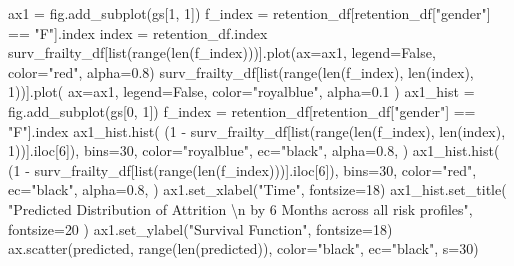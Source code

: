 \documentclass[
  letterpaper,
  DIV=11,
  numbers=noendperiod]{scrartcl}
\newenvironment{Shaded}{\begin{snugshade}}{\end{snugshade}}
\newcommand{\BuiltInTok}[1]{\textcolor[rgb]{0.00,0.23,0.31}{#1}}
\newcommand{\CharTok}[1]{\textcolor[rgb]{0.13,0.47,0.30}{#1}}
\newcommand{\DecValTok}[1]{\textcolor[rgb]{0.68,0.00,0.00}{#1}}
\newcommand{\FloatTok}[1]{\textcolor[rgb]{0.68,0.00,0.00}{#1}}
\newcommand{\NormalTok}[1]{\textcolor[rgb]{0.00,0.23,0.31}{#1}}
\newcommand{\OperatorTok}[1]{\textcolor[rgb]{0.37,0.37,0.37}{#1}}
\newcommand{\StringTok}[1]{\textcolor[rgb]{0.13,0.47,0.30}{#1}}
\newcommand{\VariableTok}[1]{\textcolor[rgb]{0.07,0.07,0.07}{#1}}
\begin{document}
\begin{Shaded}
\begin{Highlighting}[]
\NormalTok{ax1 }\OperatorTok{=}\NormalTok{ fig.add\_subplot(gs[}\DecValTok{1}\NormalTok{, }\DecValTok{1}\NormalTok{])}
\NormalTok{f\_index }\OperatorTok{=}\NormalTok{ retention\_df[retention\_df[}\StringTok{"gender"}\NormalTok{] }\OperatorTok{==} \StringTok{"F"}\NormalTok{].index}
\NormalTok{index }\OperatorTok{=}\NormalTok{ retention\_df.index}
\NormalTok{surv\_frailty\_df[}\BuiltInTok{list}\NormalTok{(}\BuiltInTok{range}\NormalTok{(}\BuiltInTok{len}\NormalTok{(f\_index)))].plot(ax}\OperatorTok{=}\NormalTok{ax1, legend}\OperatorTok{=}\VariableTok{False}\NormalTok{, color}\OperatorTok{=}\StringTok{"red"}\NormalTok{, alpha}\OperatorTok{=}\FloatTok{0.8}\NormalTok{)}
\NormalTok{surv\_frailty\_df[}\BuiltInTok{list}\NormalTok{(}\BuiltInTok{range}\NormalTok{(}\BuiltInTok{len}\NormalTok{(f\_index), }\BuiltInTok{len}\NormalTok{(index), }\DecValTok{1}\NormalTok{))].plot(}
\NormalTok{    ax}\OperatorTok{=}\NormalTok{ax1, legend}\OperatorTok{=}\VariableTok{False}\NormalTok{, color}\OperatorTok{=}\StringTok{"royalblue"}\NormalTok{, alpha}\OperatorTok{=}\FloatTok{0.1}
\NormalTok{)}
\NormalTok{ax1\_hist }\OperatorTok{=}\NormalTok{ fig.add\_subplot(gs[}\DecValTok{0}\NormalTok{, }\DecValTok{1}\NormalTok{])}
\NormalTok{f\_index }\OperatorTok{=}\NormalTok{ retention\_df[retention\_df[}\StringTok{"gender"}\NormalTok{] }\OperatorTok{==} \StringTok{"F"}\NormalTok{].index}
\NormalTok{ax1\_hist.hist(}
\NormalTok{    (}\DecValTok{1} \OperatorTok{{-}}\NormalTok{ surv\_frailty\_df[}\BuiltInTok{list}\NormalTok{(}\BuiltInTok{range}\NormalTok{(}\BuiltInTok{len}\NormalTok{(f\_index), }\BuiltInTok{len}\NormalTok{(index), }\DecValTok{1}\NormalTok{))].iloc[}\DecValTok{6}\NormalTok{]),}
\NormalTok{    bins}\OperatorTok{=}\DecValTok{30}\NormalTok{,}
\NormalTok{    color}\OperatorTok{=}\StringTok{"royalblue"}\NormalTok{,}
\NormalTok{    ec}\OperatorTok{=}\StringTok{"black"}\NormalTok{,}
\NormalTok{    alpha}\OperatorTok{=}\FloatTok{0.8}\NormalTok{,}
\NormalTok{)}
\NormalTok{ax1\_hist.hist(}
\NormalTok{    (}\DecValTok{1} \OperatorTok{{-}}\NormalTok{ surv\_frailty\_df[}\BuiltInTok{list}\NormalTok{(}\BuiltInTok{range}\NormalTok{(}\BuiltInTok{len}\NormalTok{(f\_index)))].iloc[}\DecValTok{6}\NormalTok{]),}
\NormalTok{    bins}\OperatorTok{=}\DecValTok{30}\NormalTok{,}
\NormalTok{    color}\OperatorTok{=}\StringTok{"red"}\NormalTok{,}
\NormalTok{    ec}\OperatorTok{=}\StringTok{"black"}\NormalTok{,}
\NormalTok{    alpha}\OperatorTok{=}\FloatTok{0.8}\NormalTok{,}
\NormalTok{)}
\NormalTok{ax1.set\_xlabel(}\StringTok{"Time"}\NormalTok{, fontsize}\OperatorTok{=}\DecValTok{18}\NormalTok{)}
\NormalTok{ax1\_hist.set\_title(}
    \StringTok{"Predicted Distribution of Attrition }\CharTok{\textbackslash{}n}\StringTok{ by 6 Months across all risk profiles"}\NormalTok{, fontsize}\OperatorTok{=}\DecValTok{20}
\NormalTok{)}
\NormalTok{ax1.set\_ylabel(}\StringTok{"Survival Function"}\NormalTok{, fontsize}\OperatorTok{=}\DecValTok{18}\NormalTok{)}
\NormalTok{ax.scatter(predicted, }\BuiltInTok{range}\NormalTok{(}\BuiltInTok{len}\NormalTok{(predicted)), color}\OperatorTok{=}\StringTok{"black"}\NormalTok{, ec}\OperatorTok{=}\StringTok{"black"}\NormalTok{, s}\OperatorTok{=}\DecValTok{30}\NormalTok{)}


\end{Highlighting}
\end{Shaded}
\end{document}
